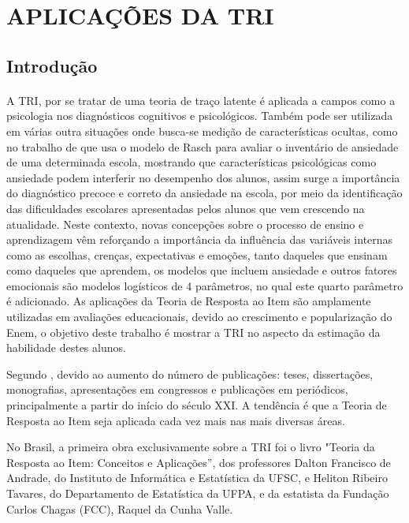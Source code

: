 \section{APLICAÇÕES DA TRI}
	\subsection{Introdução}
	\paragraph{}
	     A TRI, por se tratar de uma teoria de traço latente é aplicada a campos como a psicologia nos diagnósticos cognitivos e psicológicos. Também pode ser utilizada em várias outra situações onde busca-se medição de características ocultas, como no trabalho de \textcite{JessicaMaria} que usa o modelo de Rasch para avaliar o inventário de ansiedade de uma determinada escola, mostrando que características psicológicas como ansiedade podem interferir no desempenho dos alunos, assim surge a importância do diagnóstico precoce e correto da ansiedade na escola, por meio da identificação das dificuldades escolares apresentadas pelos alunos que vem crescendo na atualidade. Neste contexto, novas concepções sobre o processo de ensino e aprendizagem vêm reforçando a importância da influência das variáveis internas como as escolhas, crenças, expectativas e emoções, tanto daqueles que ensinam como daqueles que aprendem, os modelos que incluem ansiedade e outros fatores emocionais são modelos logísticos de 4 parâmetros, no qual este quarto parâmetro é adicionado. As aplicações da Teoria de Resposta ao Item são amplamente utilizadas em avaliações educacionais, devido ao crescimento e popularização do Enem, o objetivo deste trabalho é mostrar a TRI no aspecto da estimação da habilidade destes alunos.
	\par
    	Segundo \textcite{MOREIRAJUNIOR}, devido ao aumento do número de publicações: teses, dissertações, monografias, apresentações em congressos e publicações em periódicos, principalmente a partir do início do século XXI. A tendência é que a Teoria de Resposta ao Item seja aplicada cada vez mais nas mais diversas áreas.
    \par
    	No Brasil, a primeira obra exclusivamente sobre a TRI foi o livro "Teoria da Resposta ao Item: Conceitos e Aplicações”\cite{Dalton}, dos professores Dalton Francisco de Andrade, do Instituto de Informática e Estatística da UFSC, e Heliton Ribeiro Tavares, do Departamento de Estatística da UFPA, e da estatista da Fundação Carlos Chagas (FCC), Raquel da Cunha Valle.
